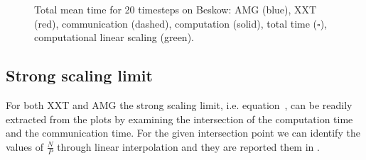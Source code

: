 \documentclass{sig-alternate}
\begin{document}
\begin{figure}
{  }
\caption{Total mean time for 20 timesteps on Beskow: AMG ({\color{blue}blue}), XXT ({\color{red}red}), communication (dashed),
  computation (solid),  total time ($\square$), computational linear scaling
  ({\color{green}green}).}
\label{fig:scaling_beskow}
\end{figure}



\subsection{Strong scaling limit}

For both XXT and AMG the strong scaling limit, i.e. equation~, can be readily extracted from the plots by examining the intersection of the computation time 
and the communication time. For the given intersection point we can identify the values of $\frac{N}{P}$ through linear interpolation and they are reported them in .
\end{document}
